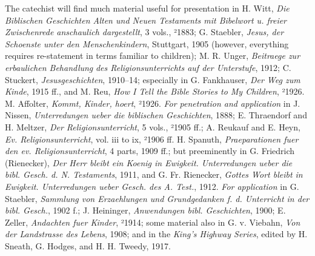 The catechist will find much material useful for presentation in H. Witt, \emph{Die Biblischen Geschichten Alten und Neuen Testaments mit Bibelwort u. freier Zwischenrede anschaulich dargestellt}, 3 vols., ²1883; G. Staebler, \emph{Jesus, der Schoenste unter den Menschenkindern}, Stuttgart, 1905 (however, everything requires re-statement in terms familiar to children); M. R. Unger, \emph{Beitraege zur erbaulichen Behandlung}
\emph{des Religionsunterrichts auf der Unterstufe}, 1912; C. Stuckert, \emph{Jesusgeschichten}, 1910–14; especially in G. Fankhauser, \emph{Der Weg zum Kinde}, 1915 ff., and M. Reu, \emph{How I Tell the Bible Stories to My Children}, ²1926. M. Affolter, \emph{Kommt, Kinder, hoert}, ²1926. \emph{For penetration and application} in J. Nissen, \emph{\emph{Unterredungen ueber die biblischen Geschichten}}, 1888; E. Thraendorf and H. Meltzer, \emph{\emph{Der Religionsunterricht}}, 5 vols., ²1905 ff.; A. Reukauf and E. Heyn, \emph{\emph{Ev. Religionsunterricht}}, vol. iii to ix, ²1906 ff. H. Spanuth, \emph{\emph{Praeparationen fuer den ev. Religionsunterricht}}, 4 parts, 1909 ff.; but preeminently in G. Friedrich (Rienecker), \emph{\emph{Der Herr bleibt ein Koenig in Ewigkeit. Unterredungen ueber die bibl. Gesch. d. N. Testaments}}, 1911, and G. Fr. Rienecker, \emph{\emph{Gottes Wort bleibt in Ewigkeit. Unterredungen ueber Gesch. des A. Test.}}, 1912. \emph{For application} in G. Staebler, \emph{\emph{Sammlung von Erzaehlungen und Grundgedanken f. d. Unterricht in der bibl. Gesch.}}, 1902 f.; J. Heininger, \emph{\emph{Anwendungen bibl. Geschichten}}, 1900; E. Zeller, \emph{\emph{Andachten fuer Kinder}}, ²1914; some material also in G. v. Viebahn, \emph{\emph{Von der Landstrasse des Lebens}}, 1908; and in the \emph{King’s Highway Series}, edited by H. Sneath, G. Hodges, and H. H. Tweedy, 1917.

